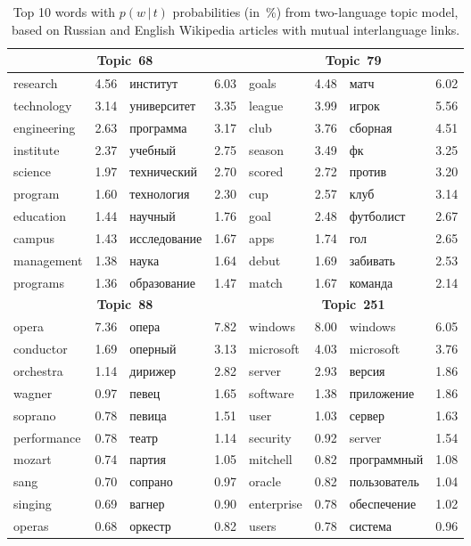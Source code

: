 \documentclass[russian,english]{llncs}
\newcommand{\cond}{\mspace{3mu}{|}\mspace{3mu}}
\begin{document}
\begin{table}[t!]
	\caption{
        Top 10 words with $p(w\cond t)$ probabilities (in~\%) from two-language topic model,
        based on Russian and English Wikipedia articles with mutual interlanguage links.}
	\label{tab:top10words}
	\centering\tabcolsep=3pt%
	\footnotesize
    \begin{tabular}{|lr|lr||lr|lr|}	
    	\hline
    	\multicolumn{4}{|c||}{\textbf{Topic~68}} & \multicolumn{4}{c|}{\textbf{Topic~79}\rule{0pt}{3ex}} \\
    	\hline
    	research & 4.56 & институт & 6.03 & goals & 4.48 & матч & 6.02 \\
    	technology & 3.14 & университет & 3.35 & league & 3.99 & игрок & 5.56 \\
    	engineering & 2.63 & программа & 3.17 & club & 3.76 &  сборная & 4.51 \\
    	institute & 2.37 & учебный & 2.75 & season & 3.49 & фк & 3.25 \\
    	science & 1.97 & технический & 2.70 & scored & 2.72 & против & 3.20 \\
    	program & 1.60 & технология & 2.30 & cup & 2.57 & клуб & 3.14 \\
    	education & 1.44 & научный & 1.76 & goal & 2.48 & футболист & 2.67 \\
    	campus & 1.43 & исследование & 1.67 & apps & 1.74 & гол & 2.65 \\
    	management & 1.38 & наука & 1.64 & debut & 1.69 & забивать & 2.53 \\
    	programs & 1.36 & образование & 1.47 & match & 1.67 & команда & 2.14 \\
    	\hline
    	\multicolumn{4}{|c||}{\textbf{Topic~88}} &     \multicolumn{4}{c|}{\textbf{Topic~251}\rule{0pt}{3ex}}  \\
    	\hline
        opera & 7.36 & опера & 7.82 & windows & 8.00 & windows & 6.05 \\
    	conductor & 1.69 & оперный & 3.13 & microsoft & 4.03 & microsoft & 3.76 \\
    	orchestra & 1.14 & дирижер & 2.82 & server & 2.93 & версия & 1.86 \\
    	wagner & 0.97 & певец & 1.65 & software & 1.38 & приложение & 1.86 \\
    	soprano & 0.78 & певица & 1.51 & user & 1.03 & сервер & 1.63 \\
    	performance & 0.78 & театр & 1.14 & security & 0.92 & server & 1.54 \\
    	mozart & 0.74 & партия & 1.05 & mitchell & 0.82 & программный & 1.08 \\
    	sang & 0.70 & сопрано & 0.97 & oracle & 0.82 &  пользователь & 1.04 \\
    	singing & 0.69 & вагнер & 0.90 & enterprise & 0.78 & обеспечение & 1.02 \\
    	operas & 0.68 & оркестр & 0.82 & users & 0.78 & система & 0.96 \\
    	\hline
	\end{tabular}
\end{table}
\end{document}
